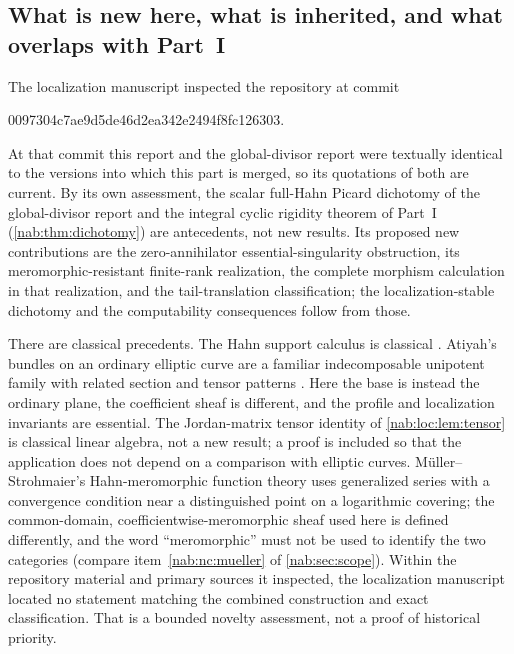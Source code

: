 \documentclass[11pt,letterpaper]{article}
\theoremstyle{definition}
\theoremstyle{remark}
\numberwithin{equation}{section}
\begin{document}
\subsection{What is new here, what is inherited, and what overlaps with Part~I}
\label{nab:loc:sub:status}

The localization manuscript inspected the repository at commit
\begin{center}\small\ttfamily
0097304c7ae9d5de46d2ea342e2494f8fc126303.
\end{center}
At that commit this report
and the global-divisor report \cite{RepoGlobal} were textually identical to
the versions into which this part is merged, so its quotations of both are
current. By its own assessment, the scalar full-Hahn Picard dichotomy of the
global-divisor report and the integral cyclic rigidity theorem of Part~I
(\cref{nab:thm:dichotomy}) are antecedents, not new results. Its proposed new
contributions are the zero-annihilator essential-singularity obstruction, its
meromorphic-resistant finite-rank realization, the complete morphism
calculation in that realization, and the tail-translation classification;
the localization-stable dichotomy and the computability consequences follow
from those.

There are classical precedents. The Hahn support calculus is classical
\cite{Neumann}. Atiyah's bundles on an ordinary elliptic curve are a familiar
indecomposable unipotent family with related section and tensor patterns
\cite{Atiyah}. Here the base is instead the ordinary plane, the coefficient
sheaf is different, and the profile and localization invariants are
essential. The Jordan-matrix tensor identity of \cref{nab:loc:lem:tensor} is
classical linear algebra, not a new result; a proof is included so that the
application does not depend on a comparison with elliptic curves.
M\"uller--Strohmaier's Hahn-meromorphic function theory \cite{Muller} uses
generalized series with a convergence condition near a distinguished point on
a logarithmic covering; the common-domain, coefficientwise-meromorphic sheaf
used here is defined differently, and the word ``meromorphic'' must not be
used to identify the two categories (compare item~\ref{nab:nc:mueller} of
\cref{nab:sec:scope}). Within the repository material and primary sources it
inspected, the localization manuscript located no statement matching the
combined construction and exact classification. That is a bounded novelty
assessment, not a proof of historical priority.
\end{document}
